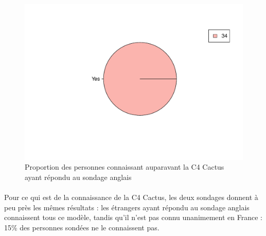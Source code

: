 \documentclass[12pt]{article}\usepackage[]{graphicx}\usepackage[]{color}
\makeatletter
\def\maxwidth{ %
  \ifdim\Gin@nat@width>\linewidth
    \linewidth
  \else
    \Gin@nat@width
  \fi
}
\newenvironment{knitrout}{}{} %
\makeatother
\begin{document}
\begin{knitrout}
\color{fgcolor}\begin{figure}[H]
\includegraphics[width=\maxwidth]{figure/know_en-1} \caption[Proportion des personnes connaissant auparavant la C4 Cactus ayant répondu au sondage anglais]{Proportion des personnes connaissant auparavant la C4 Cactus ayant répondu au sondage anglais}\label{fig:know en}
\end{figure}


\end{knitrout}

\paragraph{} Pour ce qui est de la connaissance de la C4 Cactus, les deux
sondages donnent à peu près les mêmes résultats : les étrangers ayant répondu
au sondage anglais connaissent tous ce modèle, tandis qu'il n'est pas connu
unanimement en France : 15\% des personnes sondées ne le connaissent pas.
\end{document}
